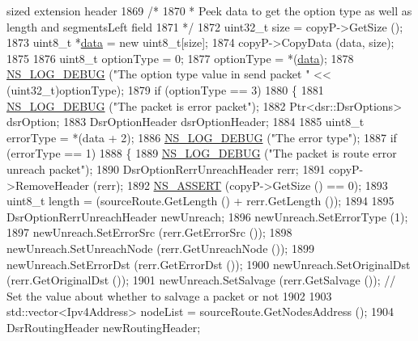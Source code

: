 \begin{DoxyCode}
{       sized extension header}
1869           \textcolor{comment}{/*}
1870 \textcolor{comment}{           * Peek data to get the option type as well as length and segmentsLeft field}
1871 \textcolor{comment}{           */}
1872           uint32\_t size = copyP->GetSize ();
1873           uint8\_t *\hyperlink{topology-example-sim_8cc_a26c65296e316af77b787dc77469bb2a4}{data} = \textcolor{keyword}{new} uint8\_t[size];
1874           copyP->CopyData (data, size);
1875 
1876           uint8\_t optionType = 0;
1877           optionType = *(\hyperlink{topology-example-sim_8cc_a26c65296e316af77b787dc77469bb2a4}{data});
1878           \hyperlink{group__logging_ga413f1886406d49f59a6a0a89b77b4d0a}{NS\_LOG\_DEBUG} (\textcolor{stringliteral}{"The option type value in send packet "} << (uint32\_t)optionType);
1879           \textcolor{keywordflow}{if} (optionType == 3)
1880             \{
1881               \hyperlink{group__logging_ga413f1886406d49f59a6a0a89b77b4d0a}{NS\_LOG\_DEBUG} (\textcolor{stringliteral}{"The packet is error packet"});
1882               Ptr<dsr::DsrOptions> dsrOption;
1883               DsrOptionHeader dsrOptionHeader;
1884 
1885               uint8\_t errorType = *(data + 2);
1886               \hyperlink{group__logging_ga413f1886406d49f59a6a0a89b77b4d0a}{NS\_LOG\_DEBUG} (\textcolor{stringliteral}{"The error type"});
1887               \textcolor{keywordflow}{if} (errorType == 1)
1888                 \{
1889                   \hyperlink{group__logging_ga413f1886406d49f59a6a0a89b77b4d0a}{NS\_LOG\_DEBUG} (\textcolor{stringliteral}{"The packet is route error unreach packet"});
1890                   DsrOptionRerrUnreachHeader rerr;
1891                   copyP->RemoveHeader (rerr);
1892                   \hyperlink{assert_8h_a6dccdb0de9b252f60088ce281c49d052}{NS\_ASSERT} (copyP->GetSize () == 0);
1893                   uint8\_t length = (sourceRoute.GetLength () + rerr.GetLength ());
1894 
1895                   DsrOptionRerrUnreachHeader newUnreach;
1896                   newUnreach.SetErrorType (1);
1897                   newUnreach.SetErrorSrc (rerr.GetErrorSrc ());
1898                   newUnreach.SetUnreachNode (rerr.GetUnreachNode ());
1899                   newUnreach.SetErrorDst (rerr.GetErrorDst ());
1900                   newUnreach.SetOriginalDst (rerr.GetOriginalDst ());
1901                   newUnreach.SetSalvage (rerr.GetSalvage ());       \textcolor{comment}{// Set the value about whether to
       salvage a packet or not}
1902 
1903                   std::vector<Ipv4Address> nodeList = sourceRoute.GetNodesAddress ();
1904                   DsrRoutingHeader newRoutingHeader;

\end{DoxyCode}
